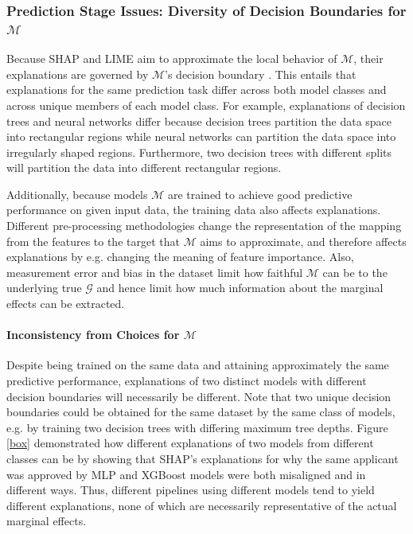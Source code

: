 \documentclass[mnsc,blindrev]{informs3}
\begin{document}
        \subsubsection{Prediction Stage Issues: Diversity of Decision Boundaries for $\mathcal{M}$}
            \label{sec:rashomon_overfitting}
            Because SHAP and LIME aim to approximate the local behavior of $\mathcal{M}$, their explanations are governed by $\mathcal{M}$'s decision boundary \citep{han22which}. This entails that explanations for the same prediction task differ across both model classes and across unique members of each model class. For example, explanations of decision trees and neural networks differ because decision trees partition the data space into rectangular regions while neural networks can partition the data space into irregularly shaped regions. Furthermore, two decision trees with different splits will partition the data into different rectangular regions. 
    
            Additionally, because models $\mathcal{M}$ are trained to achieve good predictive performance on given input data, the training data also affects explanations. Different pre-processing methodologies change the representation of the mapping from the features to the target that $\mathcal{M}$ aims to approximate, and therefore affects explanations by e.g. changing the meaning of feature importance. Also, measurement error and bias in the dataset limit how faithful $\mathcal{M}$ can be to the underlying true $\mathcal{G}$ and hence limit how much information about the marginal effects can be extracted. 
            
    
    
            \paragraph{\textbf{Inconsistency from  Choices for $\mathcal{M}$}}
            Despite being trained on the same data and attaining approximately the same predictive performance, explanations of two distinct models with different decision boundaries will necessarily be different. Note that two unique decision boundaries could be obtained for the same dataset by the same class of models, e.g. by training two decision trees with differing maximum tree depths. Figure \ref{box} demonstrated how different explanations of two models from different classes can be by showing that SHAP's explanations for why the same applicant was approved by MLP and XGBoost models were both misaligned and in different ways. Thus, different pipelines using different models tend to yield different explanations, none of which are necessarily representative of the actual marginal effects.
    
\end{document}
